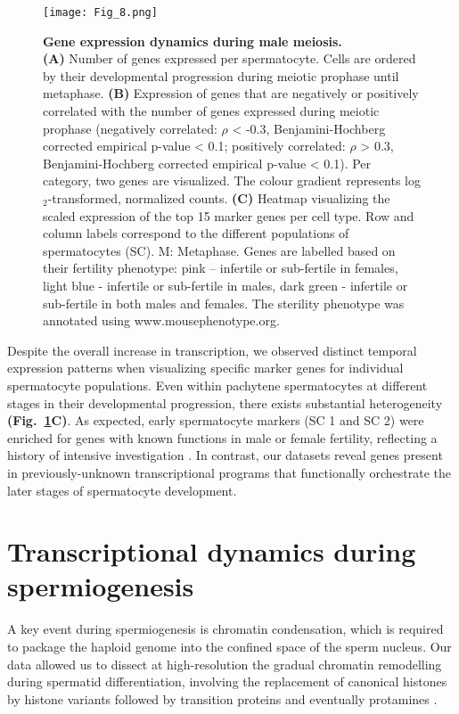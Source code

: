 \begin{figure}[!h]
\centering
\texttt{[image: Fig\_8.png]}
\caption[Gene expression dynamics during male meiosis]{\textbf{Gene expression dynamics during male meiosis.} \\
\textbf{(A)} Number of genes expressed per spermatocyte. Cells are ordered by their developmental progression during meiotic prophase until metaphase. \textbf{(B)} Expression of genes that are negatively or positively correlated with the number of genes expressed during meiotic prophase (negatively correlated: $\rho$ < -0.3, Benjamini-Hochberg corrected empirical p-value < 0.1; positively correlated: $\rho$ > 0.3, Benjamini-Hochberg corrected empirical p-value < 0.1). Per category, two genes are visualized. The colour gradient represents log$_2$-transformed, normalized counts. \textbf{(C)} Heatmap visualizing the scaled expression of the top 15 marker genes per cell type. Row and column labels correspond to the different populations of spermatocytes (SC). M: Metaphase. Genes are labelled based on their fertility phenotype: pink – infertile or sub-fertile in females, light blue - infertile or sub-fertile in males, dark green - infertile or sub-fertile in both males and females. The sterility phenotype was annotated using www.mousephenotype.org.}
\label{fig3:meiosis}
\end{figure}

Despite the overall increase in transcription, we observed distinct temporal expression patterns when visualizing specific marker genes for individual spermatocyte populations. Even within pachytene spermatocytes at different stages in their developmental progression, there exists substantial heterogeneity \textbf{(Fig.~\ref{fig3:meiosis}C)}. As expected, early spermatocyte markers (SC 1 and SC 2) were enriched for genes with known functions in male or female fertility, reflecting a history of intensive investigation \citep{Deng2002, Spruck2003, Vries2005}. In contrast, our datasets reveal genes present in previously-unknown transcriptional programs that functionally orchestrate the later stages of spermatocyte development.

\section{Transcriptional dynamics during spermiogenesis}
\label{sec3:spermiogenesis}

A key event during spermiogenesis is chromatin condensation, which is required to package the haploid genome into the confined space of the sperm nucleus. Our data allowed us to dissect at high-resolution the gradual chromatin remodelling during spermatid differentiation, involving the replacement of canonical histones by histone variants followed by transition proteins and eventually protamines \citep{Balhorn2007, Kennani2017}. \\

